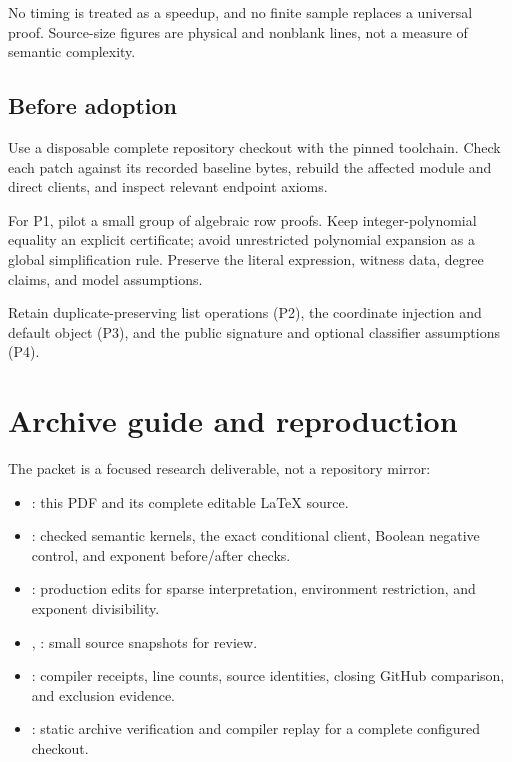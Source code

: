 No timing is treated as a speedup, and no finite sample replaces a universal
proof. Source-size figures are physical and nonblank lines, not a measure of
semantic complexity.

\subsection{Before adoption}

Use a disposable complete repository checkout with the pinned toolchain.
Check each patch against its recorded baseline bytes, rebuild the affected
module and direct clients, and inspect relevant endpoint axioms.

For P1, pilot a small group of algebraic row proofs. Keep integer-polynomial
equality an explicit certificate; avoid unrestricted polynomial expansion
as a global simplification rule. Preserve the literal expression, witness
data, degree claims, and model assumptions.

Retain duplicate-preserving list operations (P2), the coordinate injection
and default object (P3), and the public signature and optional classifier
assumptions (P4).

\section{Archive guide and reproduction}

The packet is a focused research deliverable, not a repository mirror:

\begin{itemize}
\item {}: this PDF and its complete editable LaTeX source.
\item {}: checked semantic kernels, the exact conditional client,
Boolean negative control, and exponent before/after checks.
\item {}: production edits for sparse interpretation, environment
restriction, and exponent divisibility.
\item {}, : small source snapshots for review.
\item {}: compiler receipts, line counts, source identities,
closing GitHub comparison, and exclusion evidence.
\item {}: static archive verification and compiler replay for a
complete configured checkout.
\end{itemize}

